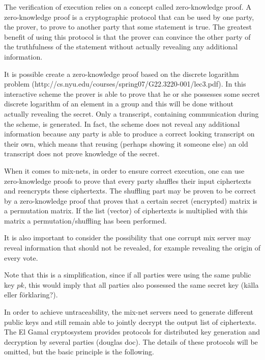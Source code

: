 The verification of execution relies on a concept called
zero-knowledge proof. A zero-knowledge proof is a cryptographic
protocol that can be used by one party, the prover, to prove to
another party that some statement is true. The greatest benefit of
using this protocol is that the prover can convince the other party of
the truthfulness of the statement without actually revealing any
additional information.

It is possible create a zero-knowledge proof based on the discrete
logarithm problem
(http://cs.nyu.edu/courses/spring07/G22.3220-001/lec3.pdf). In this
interactive scheme the prover is able to prove that he or she
possesses some secret discrete logarithm of an element in a group and
this will be done without actually revealing the secret. Only a
transcript, containing communication during the scheme, is
generated. In fact, the scheme does not reveal any additional
information because any party is able to produce a correct looking
transcript on their own, which means that reusing (perhaps showing it
someone else) an old transcript does not prove knowledge of the
secret.

When it comes to mix-nets, in order to ensure correct execution, one
can use zero-knowledge proofs to prove that every party shuffles their
input ciphertexts and reencrypts these ciphertexts. The shuffling part
may be proven to be correct by a zero-knowledge proof that proves that
a certain secret (encrypted) matrix is a permutation matrix. If the
list (vector) of ciphertexts is multiplied with this matrix a
permutation/shuffling has been performed.

It is also important to consider the possibility that one corrupt mix
server may reveal information that should not be revealed, for example
revealing the origin of every vote.

Note that this is a simplification, since if all parties were using
the same public key $pk$, this would imply that all parties also
possessed the same secret key (källa eller förklaring?).

In order to achieve untraceability, the mix-net servers need to
generate different public keys and still remain able to jointly
decrypt the output list of ciphertexts. The El Gamal cryptosystem
provides protocols for distributed key generation and decryption by
several parties (douglas doc). The details of these protocols will be
omitted, but the basic principle is the following.

